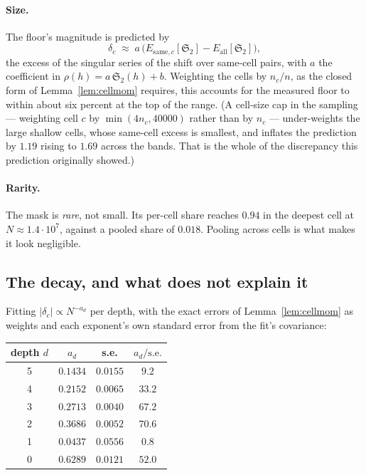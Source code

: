 \documentclass[11pt,a4paper]{article}
\theoremstyle{plain}
\theoremstyle{definition}
\renewcommand{\SS}{\mathfrak{S}}
\begin{document}
\paragraph{Size.} The floor's magnitude is predicted by
\[
  \delta_c \;\approx\; a\,\bigl(E_{\mathrm{same},c}[\SS_2]
  - E_{\mathrm{all}}[\SS_2]\bigr),
\]
the excess of the singular series of the shift over same-cell pairs,
with $a$ the coefficient in $\rho(h) = a\,\SS_2(h)+b$. Weighting the
cells by $n_c/n$, as the closed form of Lemma~\ref{lem:cellmom}
requires, this accounts for the measured floor to within about six
percent at the top of the range. (A cell-size cap in the sampling ---
weighting cell $c$ by $\min(4n_c, 40000)$ rather than by $n_c$ ---
under-weights the large shallow cells, whose same-cell excess is
smallest, and inflates the prediction by $1.19$ rising to $1.69$ across
the bands. That is the whole of the discrepancy this prediction
originally showed.)

\paragraph{Rarity.} The mask is \emph{rare}, not small. Its per-cell
share reaches $0.94$ in the deepest cell at $N\approx1.4\cdot10^7$,
against a pooled share of $0.018$. Pooling across cells is what makes
it look negligible.

\subsection{The decay, and what does not explain it}

Fitting $|\delta_c| \propto N^{-a_d}$ per depth, with the exact errors
of Lemma~\ref{lem:cellmom} as weights and each exponent's own standard
error from the fit's covariance:

\begin{center}
\begin{tabular}{cccc}
\hline
depth $d$ & $a_d$ & s.e. & $a_d/\mathrm{s.e.}$\\
\hline
5 & $0.1434$ & $0.0155$ & $9.2$\\
4 & $0.2152$ & $0.0065$ & $33.2$\\
3 & $0.2713$ & $0.0040$ & $67.2$\\
2 & $0.3686$ & $0.0052$ & $70.6$\\
1 & $0.0437$ & $0.0556$ & $0.8$\\
0 & $0.6289$ & $0.0121$ & $52.0$\\
\hline
\end{tabular}
\end{center}
\end{document}
